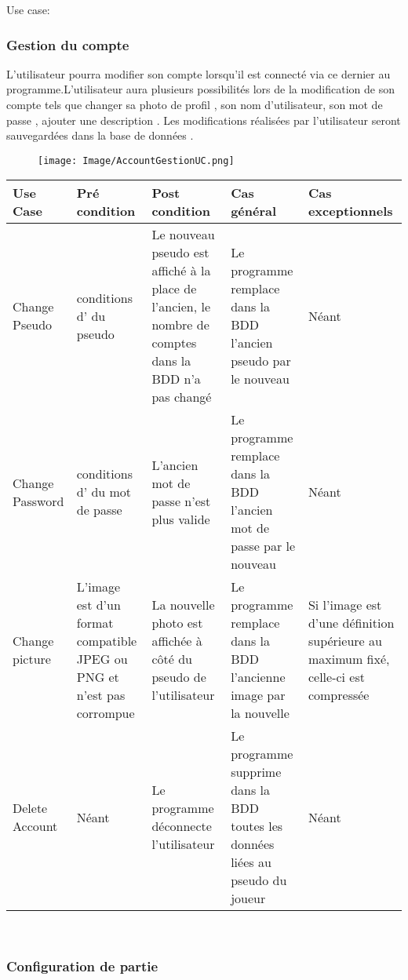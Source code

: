\documentclass[french, utf8]{article}
\begin{document}
Use case: 


\subsubsection{Gestion du compte}
\label{sec:GestionDeCompte}
L'utilisateur pourra modifier son compte lorsqu'il est connecté via ce dernier au programme.L'utilisateur aura plusieurs possibilités lors de la modification de son compte tels que changer sa photo de profil , son nom d'utilisateur, son mot de passe , ajouter une description . Les modifications réalisées par l'utilisateur seront sauvegardées dans la base de données .
\begin{figure}[ht]
     \centering
    \texttt{[image: Image/AccountGestionUC.png]}
\end{figure}

\begin{center}
\begin{tabular}{|m{3cm}|m{3cm}|m{3cm}|m{3cm}|m{3cm}|}
\hline  Use Case & Pré condition      &  Post condition  & Cas général & Cas exceptionnels\\

\hline Change Pseudo  & conditions d'\nameref{sec:Enregistrement} du pseudo & Le nouveau pseudo est affiché à la place de l'ancien, le nombre de comptes dans la BDD n'a pas changé & Le programme remplace dans la BDD l'ancien pseudo par le nouveau & Néant \\
\hline Change Password  & conditions d'\nameref{sec:Enregistrement} du mot de passe & L'ancien mot de passe n'est plus valide & Le programme remplace dans la BDD l'ancien mot de passe par le nouveau & Néant \\
\hline Change picture  & L'image est d'un format compatible JPEG ou PNG et n'est pas corrompue & La nouvelle photo est affichée à côté du pseudo de l'utilisateur & Le programme remplace dans la BDD l'ancienne image par la nouvelle & Si l'image est d'une définition supérieure au maximum fixé, celle-ci est compressée \\
\hline Delete Account  & Néant &  Le programme déconnecte l'utilisateur  & Le programme supprime dans la BDD toutes les données liées au pseudo du joueur & Néant \\
\hline
\end{tabular}\\
\end{center}


\subsubsection{Configuration de partie}
\end{document}
